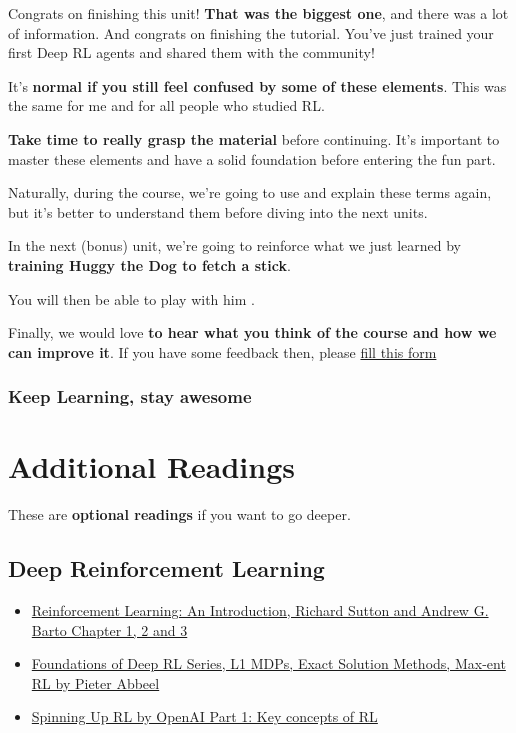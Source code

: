 \documentclass[11pt,a4paper]{article}
\begin{document}
Congrats on finishing this unit! \textbf{That was the biggest one}, and there was a lot of information. And congrats on finishing the tutorial. You've just trained your first Deep RL agents and shared them with the community!

It's \textbf{normal if you still feel confused by some of these elements}. This was the same for me and for all people who studied RL.

\textbf{Take time to really grasp the material} before continuing. It's important to master these elements and have a solid foundation before entering the fun part.

Naturally, during the course, we're going to use and explain these terms again, but it's better to understand them before diving into the next units.

In the next (bonus) unit, we're going to reinforce what we just learned by \textbf{training Huggy the Dog to fetch a stick}.

You will then be able to play with him .


Finally, we would love \textbf{to hear what you think of the course and how we can improve it}. If you have some feedback then, please \href{https://forms.gle/BzKXWzLAGZESGNaE9}{fill this form}

\subsubsection{Keep Learning, stay awesome}\label{keep-learning-stay-awesome-1}

\section{Additional Readings}\label{additional-readings}

These are \textbf{optional readings} if you want to go deeper.

\subsection{Deep Reinforcement Learning}\label{deep-reinforcement-learning}

\begin{itemize}
\tightlist
\item
  \href{http://incompleteideas.net/book/RLbook2020.pdf}{Reinforcement Learning: An Introduction, Richard Sutton and Andrew G. Barto Chapter 1, 2 and 3}
\item
  \href{https://youtu.be/2GwBez0D20A}{Foundations of Deep RL Series, L1 MDPs, Exact Solution Methods, Max-ent RL by Pieter Abbeel}
\item
  \href{https://spinningup.openai.com/en/latest/spinningup/rl_intro.html}{Spinning Up RL by OpenAI Part 1: Key concepts of RL}
\end{itemize}
\end{document}
